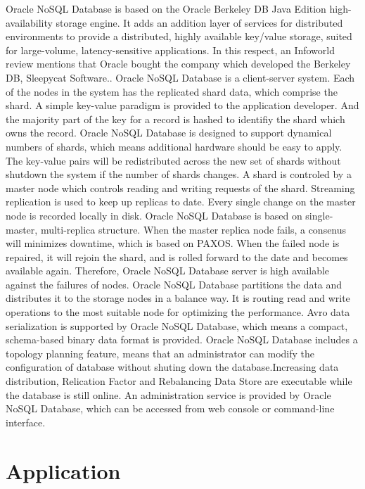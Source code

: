 Oracle NoSQL Database is based on the Oracle Berkeley DB Java Edition high-availability storage engine. It adds an addition layer of services for distributed environments to provide a distributed, highly available key/value storage, suited for large-volume, latency-sensitive applications.
In this respect, an Infoworld review mentions that Oracle bought the company which developed the Berkeley DB, Sleepycat Software.\cite{hid-sp18-515-editor00}.
Oracle NoSQL Database is a client-server system. Each of the nodes in the system has the replicated shard data, which comprise the shard. A simple key-value paradigm is provided to the application developer. And the majority part of the key for a record is hashed to identifiy the shard which owns the record. Oracle NoSQL Database is designed to support dynamical numbers of shards, which means additional hardware should be easy to apply. The key-value pairs will be redistributed across the new set of shards without shutdown the system if the number of shards changes. A shard is controled by a master node which controls reading and writing requests of the shard. Streaming replication is used to keep up replicas to date. Every single change on the master node is recorded locally in disk.
Oracle NoSQL Database is based on single-master, multi-replica structure. When the master replica node fails, a consenus will minimizes downtime, which is based on PAXOS. When the failed node is repaired, it will rejoin the shard, and is rolled forward to the date and becomes available again. Therefore, Oracle NoSQL Database server is high available against the failures of nodes. 
Oracle NoSQL Database partitions the data and distributes it to the storage nodes in a balance way. It is routing read and write operations to the most suitable node for optimizing the performance.
Avro data serialization is supported by Oracle NoSQL Database, which means a compact, schema-based binary data format is provided.
Oracle NoSQL Database includes a topology planning feature, means that an administrator can modify the configuration of database without shuting down the database.Increasing data distribution, Relication Factor and Rebalancing Data Store are executable while the database is still online. 
An administration service is provided by Oracle NoSQL Database, which can be accessed from web console or command-line interface. 


\section{Application}

